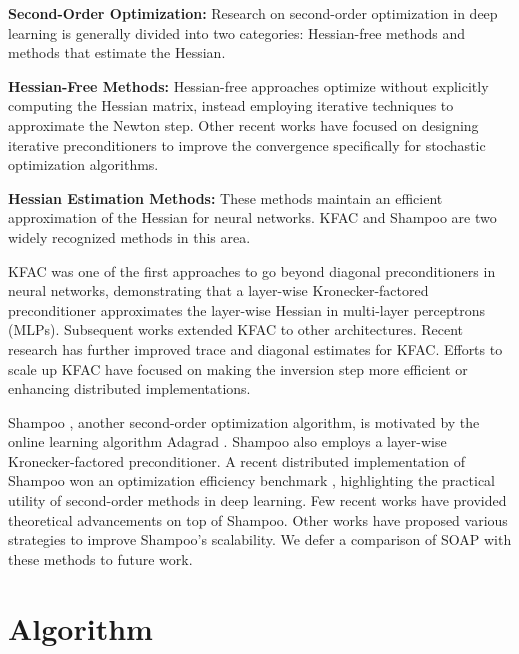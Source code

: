 \documentclass{article}
\begin{document}
\textbf{Second-Order Optimization:} Research on second-order optimization in deep 
learning is generally divided into two categories: Hessian-free methods and methods 
that estimate the Hessian.

\textbf{Hessian-Free Methods:} Hessian-free approaches \citep{martens10, martens15} 
optimize without explicitly computing the Hessian matrix, instead employing iterative 
techniques to approximate the Newton step. Other recent works \citep{li18psgd, 
li2024stochastichessianfittingslie, pooladzandi2024curvatureinformed} have focused on 
designing iterative preconditioners to improve the convergence specifically for stochastic
optimization algorithms.

\textbf{Hessian Estimation Methods:} These methods maintain an efficient 
approximation of the Hessian for neural networks. KFAC \citep{martens15} and Shampoo 
\citep{shampoo} are two widely recognized methods in this area.

KFAC \citep{martens15} was one of the first approaches to go beyond diagonal 
preconditioners in neural networks, demonstrating that a layer-wise Kronecker-factored 
preconditioner approximates the layer-wise Hessian in multi-layer perceptrons (MLPs). 
Subsequent works \citep{martens2018kroneckerrecurrent, kazuki19} extended KFAC to other 
architectures. Recent research \citep{ekfac, Gao_Liu_Huang_Wang_Wang_Xu_Yu_2021} has 
further improved trace and diagonal estimates for KFAC. Efforts to scale up KFAC 
\citep{ba2017distributed, Puiu22, puiu2023brandnewkfacsspeeding, eschenhagen2023kroneckerfactored} 
have focused on making the inversion step more efficient or enhancing distributed 
implementations.

Shampoo \citep{shampoo}, another second-order optimization algorithm, is motivated by 
the online learning algorithm Adagrad \citep{JMLR:v12:duchi11a}. Shampoo also employs 
a layer-wise Kronecker-factored preconditioner. A recent distributed implementation of 
Shampoo \citep{distributedshampoo} won an optimization efficiency benchmark 
\citep{dahl2023benchmarking}, highlighting the practical utility of second-order methods 
in deep learning. Few recent works \citep{caspr, whyshampoo} have provided theoretical advancements on top of Shampoo. Other works \citep{anil2020scalable, peirson2022fishy, wulin2024, 
4bitshampoo} have proposed various strategies to improve Shampoo’s scalability. We defer 
a comparison of SOAP with these methods to future work.

\section{Algorithm}
\label{sec:alg}
\end{document}
